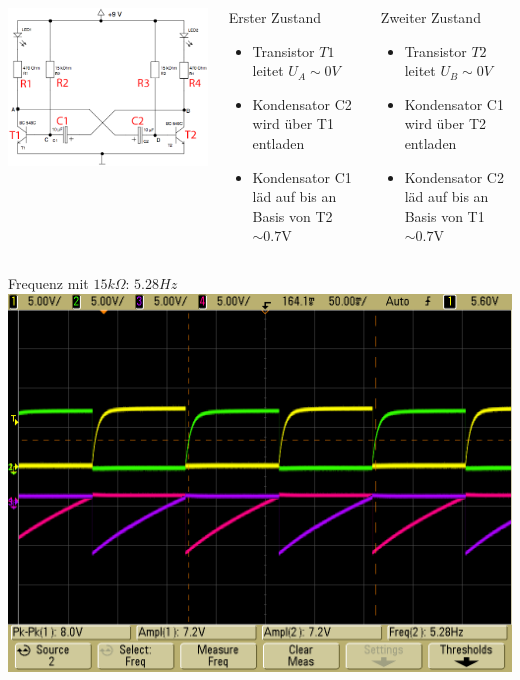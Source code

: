 \documentclass[compress,11pt]{beamer}
\begin{document}
\begin{frame}
	\begin{columns}
	\includegraphics[width=\textwidth]{schaltbilder/blinkkommentar.png}
	\begin{block}{Erster Zustand}
		\begin{itemize}
		\item Transistor $T1$ leitet $U_A \sim 0V$
		\item Kondensator C2 wird über T1 entladen
		\item Kondensator C1 läd auf bis an Basis von T2 $\sim0.7$V
		\end{itemize}
	\end{block}
	\begin{block}{Zweiter Zustand}
	\begin{itemize}
	\item Transistor $T2$ leitet $U_B \sim 0V$
	\item Kondensator C1 wird über T2 entladen 
	\item Kondensator C2 läd auf bis an Basis von T1 $\sim 0.7$V 
	\end{itemize}
	\end{block}
	\end{columns}
\end{frame}
\begin{frame}
Frequenz mit $15k\Omega$: $5.28Hz$
\includegraphics[width=.7\textwidth]{scope_43.png}
\end{frame}
\end{document}
